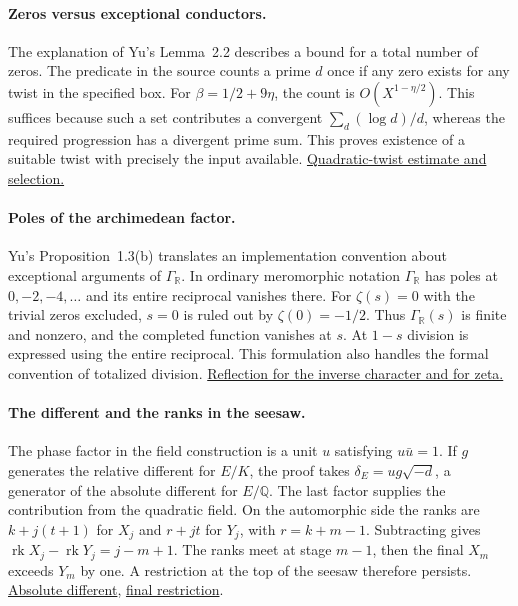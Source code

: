 \paragraph{Zeros versus exceptional conductors.}
The explanation of Yu's Lemma~2.2 describes a bound for a total number of zeros. The predicate in the source counts a prime $d$ once if any zero exists for any twist in the specified box. For $\beta=1/2+9\eta$, the count is $O(X^{1-\eta/2})$. This suffices because such a set contributes a convergent $\sum_d (\log d)/d$, whereas the required progression has a divergent prime sum. This proves existence of a suitable twist with precisely the input available. \href{https://github.com/VladimirReshetnikov/ProveIt/blob/7a5bb1e051e4bad127bafe90abbea19764778e32/Analysis/GeneralizedRiemannHypothesis/Lean/grh/src/Lib/Analytic/QuadraticTwist.lean\#L670-L835}{Quadratic-twist estimate and selection.}

\paragraph{Poles of the archimedean factor.}
Yu's Proposition~1.3(b) translates an implementation convention about exceptional arguments of $\Gamma_{\mathbb R}$. In ordinary meromorphic notation $\Gamma_{\mathbb R}$ has poles at $0,-2,-4,\ldots$ and its entire reciprocal vanishes there. For $\zeta(s)=0$ with the trivial zeros excluded, $s=0$ is ruled out by $\zeta(0)=-1/2$. Thus $\Gamma_{\mathbb R}(s)$ is finite and nonzero, and the completed function vanishes at $s$. At $1-s$ division is expressed using the entire reciprocal. This formulation also handles the formal convention of totalized division. \href{https://github.com/VladimirReshetnikov/ProveIt/blob/7a5bb1e051e4bad127bafe90abbea19764778e32/Analysis/GeneralizedRiemannHypothesis/Lean/grh/src/New/Main.lean\#L29-L65}{Reflection for the inverse character and for zeta.}

\paragraph{The different and the ranks in the seesaw.}
The phase factor in the field construction is a unit $u$ satisfying $u\bar u=1$. If $g$ generates the relative different for $E/K$, the proof takes $\delta_E=u g\sqrt{-d}$, a generator of the absolute different for $E/\mathbb Q$. The last factor supplies the contribution from the quadratic field. On the automorphic side the ranks are $k+j(t+1)$ for $X_j$ and $r+jt$ for $Y_j$, with $r=k+m-1$. Subtracting gives $\operatorname{rk}X_j-\operatorname{rk}Y_j=j-m+1$. The ranks meet at stage $m-1$, then the final $X_m$ exceeds $Y_m$ by one. A restriction at the top of the seesaw therefore persists. \href{https://github.com/VladimirReshetnikov/ProveIt/blob/7a5bb1e051e4bad127bafe90abbea19764778e32/Analysis/GeneralizedRiemannHypothesis/Lean/grh/src/New/Derivatives/Field/PrimeDecomposition.lean\#L333-L374}{Absolute different}, \href{https://github.com/VladimirReshetnikov/ProveIt/blob/7a5bb1e051e4bad127bafe90abbea19764778e32/Analysis/GeneralizedRiemannHypothesis/Lean/grh/src/New/UpperBound/Seesaw/SeesawIdentity.lean\#L623-L658}{final restriction}.


